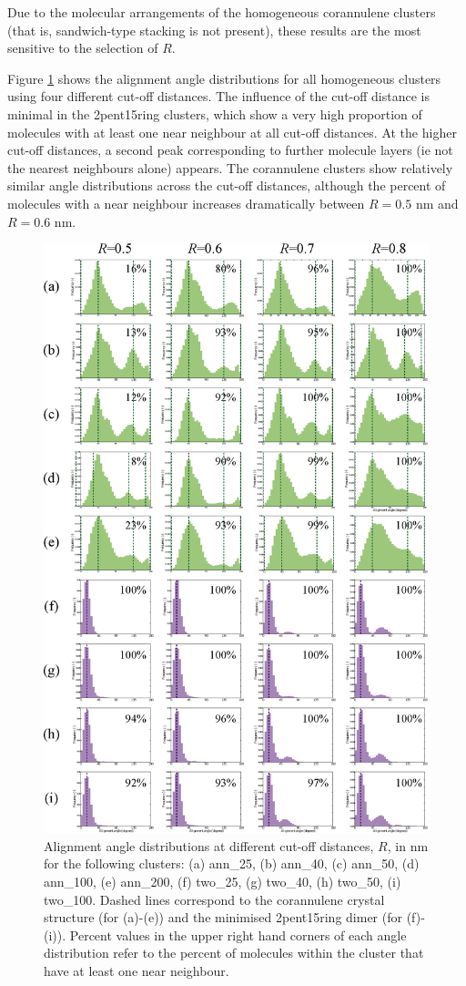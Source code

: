 Due to the molecular arrangements of the homogeneous corannulene clusters (that is, sandwich-type stacking is not present), these results are the most sensitive to the selection of $R$.


Figure \ref{figSI:alignmentangles_cutoffs} shows the alignment angle distributions for all homogeneous clusters using four different cut-off distances.  The influence of the cut-off distance is minimal in the 2pent15ring clusters, which show a very high proportion of molecules with at least one near neighbour at all cut-off distances.  At the higher cut-off distances, a second peak corresponding to further molecule layers (ie not the nearest neighbours alone) appears.  The corannulene clusters show relatively similar angle distributions across the cut-off distances, although the percent of molecules with a near neighbour increases dramatically between $R=0.5$ nm and $R=0.6$ nm.  
%
\begin{figure}[!tbh]
\centering
\includegraphics[width=0.85\linewidth]{Figures/AlignmentAnglesCutoffAssessment_SI.eps}
\caption{Alignment angle distributions at different cut-off distances, $R$, in nm for the following clusters: (a) ann\_25, (b) ann\_40, (c) ann\_50, (d) ann\_100, (e) ann\_200, (f) two\_25, (g) two\_40, (h) two\_50, (i) two\_100. Dashed lines correspond to the corannulene crystal structure (for (a)-(e)) and the minimised 2pent15ring dimer (for (f)-(i)). Percent values in the upper right hand corners of each angle distribution refer to the percent of molecules within the cluster that have at least one near neighbour.}
\label{figSI:alignmentangles_cutoffs}
\end{figure}
%

